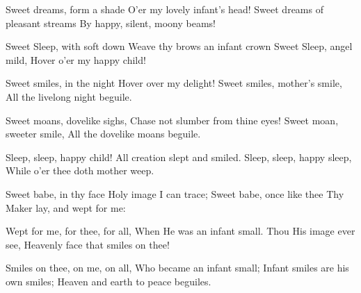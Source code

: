 
\begin{poem}

\begin{stanza}
Sweet dreams, form a shade\verseline
O'er my lovely infant's head!\verseline
Sweet dreams of pleasant streams\verseline
By happy, silent, moony beams!
\end{stanza}
\begin{stanza}
Sweet Sleep, with soft down\verseline
Weave thy brows an infant crown\verseline
Sweet Sleep, angel mild,\verseline
Hover o'er my happy child!
\end{stanza}
\begin{stanza}
Sweet smiles, in the night\verseline
Hover over my delight!\verseline
Sweet smiles, mother's smile,\verseline
All the livelong night beguile.
\end{stanza}
\begin{stanza}
Sweet moans, dovelike sighs,\verseline
Chase not slumber from thine eyes!\verseline
Sweet moan, sweeter smile,\verseline
All the dovelike moans beguile.
\end{stanza}
\begin{stanza}
Sleep, sleep, happy child!\verseline
All creation slept and smiled.\verseline
Sleep, sleep, happy sleep,\verseline
While o'er thee doth mother weep.
\end{stanza}
\begin{stanza}
Sweet babe, in thy face\verseline
Holy image I can trace;\verseline
Sweet babe, once like thee\verseline
Thy Maker lay, and wept for me:
\end{stanza}
\begin{stanza}
Wept for me, for thee, for all,\verseline
When He was an infant small.\verseline
Thou His image ever see,\verseline
Heavenly face that smiles on thee!
\end{stanza}
\begin{stanza}
Smiles on thee, on me, on all,\verseline
Who became an infant small;\verseline
Infant smiles are his own smiles;\verseline
Heaven and earth to peace beguiles.
\end{stanza}

\end{poem}